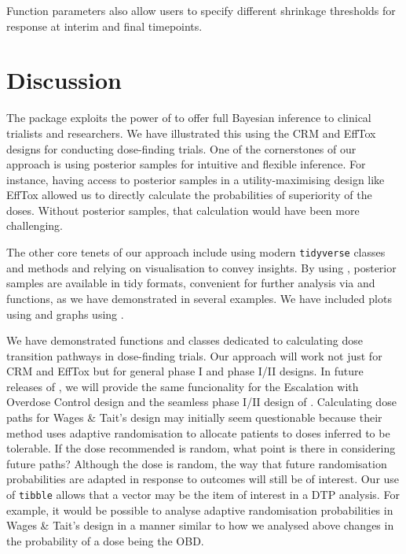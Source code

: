 \documentclass[article]{jss}
\begin{document}
Function parameters also allow users to specify different shrinkage
thresholds for response at interim and final timepoints.

\hypertarget{discussion}{%
\section{Discussion}\label{discussion}}

The  package exploits the power of  to offer
full Bayesian inference to clinical trialists and researchers. We have
illustrated this using the CRM and EffTox designs for conducting
dose-finding trials. One of the cornerstones of our approach is using
posterior samples for intuitive and flexible inference. For instance,
having access to posterior samples in a utility-maximising design like
EffTox allowed us to directly calculate the probabilities of superiority
of the doses. Without posterior samples, that calculation would have
been more challenging.

The other core tenets of our approach include using modern
\texttt{tidyverse} \citep{tidyverse} classes and methods and relying on
visualisation to convey insights. By using 
\citep{tidybayes}, posterior samples are available in tidy formats,
convenient for further analysis via  \citep{dplyr} and
 \citep{purrr} functions, as we have demonstrated in several
examples. We have included plots using  \citep{ggplot2} and
graphs using  \citep{DiagrammeR}.

We have demonstrated functions and classes dedicated to calculating dose
transition pathways in dose-finding trials. Our approach will work not
just for CRM and EffTox but for general phase I and phase I/II designs.
In future releases of , we will provide the same
funcionality for the Escalation with Overdose Control design
\citep{Tighiouart2010} and the seamless phase I/II design of
\citet{Wages2014}. Calculating dose paths for Wages \& Tait's design may
initially seem questionable because their method uses adaptive
randomisation to allocate patients to doses inferred to be tolerable. If
the dose recommended is random, what point is there in considering
future paths? Although the dose is random, the way that future
randomisation probabilities are adapted in response to outcomes will
still be of interest. Our use of \texttt{tibble} allows that a vector
may be the item of interest in a DTP analysis. For example, it would be
possible to analyse adaptive randomisation probabilities in Wages \&
Tait's design in a manner similar to how we analysed above changes in
the probability of a dose being the OBD.
\end{document}

